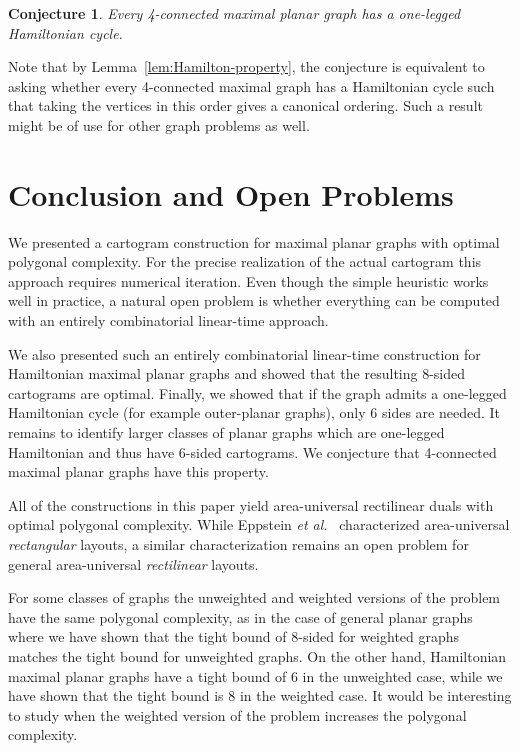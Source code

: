 \documentclass[11pt]{article}
\newtheorem{conjecture}{Conjecture}[section]
\begin{document}
\begin{conjecture}
Every 4-connected maximal planar graph has a one-legged Hamiltonian cycle.
\end{conjecture}

Note that by Lemma~\ref{lem:Hamilton-property}, the conjecture is
equivalent to asking whether every 4-connected maximal graph has
a Hamiltonian cycle such that taking the vertices in this order gives
a canonical ordering.  Such a result might be of use for other graph
problems as well.














\section{Conclusion and Open Problems}
\label{sec:conc}

We presented a cartogram construction for maximal planar graphs with optimal polygonal complexity. For the precise realization of the actual cartogram this approach requires numerical iteration. Even though the simple heuristic works well in practice, a natural open problem is whether everything can be computed with an entirely combinatorial linear-time approach.

We also presented such an entirely combinatorial linear-time
construction for Hamiltonian maximal planar graphs and showed that the
resulting 8-sided cartograms are optimal. Finally, we showed that if the graph admits a one-legged Hamiltonian cycle (for example outer-planar graphs), only 6 sides are needed. It remains to identify larger classes
of planar graphs which are one-legged Hamiltonian and thus have 6-sided
cartograms. We conjecture that 4-connected maximal planar graphs have
this property.

All of the constructions in this paper yield area-universal
rectilinear duals with optimal polygonal complexity. While Eppstein
{\em et al.}~\cite{EMVS} characterized area-universal {\em rectangular}
layouts, a similar characterization remains an open problem for general area-universal
{\em rectilinear} layouts.



For some classes of graphs the unweighted and weighted versions of the
problem have the same polygonal complexity, as in the case of general
planar graphs where we have shown that the tight bound of 8-sided for
weighted graphs matches the tight bound for unweighted graphs. On the
other hand, Hamiltonian maximal planar graphs have a tight bound of 6 in the
unweighted case, while we have shown that the tight bound is 8 in the
weighted case. It would be interesting to study when the weighted
version of the problem increases the polygonal complexity.
\end{document}
